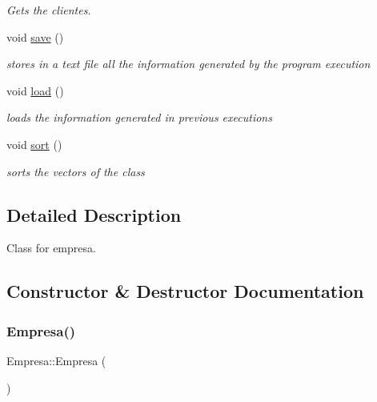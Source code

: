 \begin{DoxyCompactItemize}
\begin{DoxyCompactList}\small\item\em Gets the clientes. \end{DoxyCompactList}\item 
\mbox{\label{classEmpresa_afbde694da902870437443de43dae8071}} 
void \hyperlink{classEmpresa_afbde694da902870437443de43dae8071}{save} ()
\begin{DoxyCompactList}\small\item\em stores in a text file all the information generated by the program execution \end{DoxyCompactList}\item 
\mbox{\label{classEmpresa_a3445c3c507b4f45d1d7831908ff4cdf1}} 
void \hyperlink{classEmpresa_a3445c3c507b4f45d1d7831908ff4cdf1}{load} ()
\begin{DoxyCompactList}\small\item\em loads the information generated in previous executions \end{DoxyCompactList}\item 
\mbox{\label{classEmpresa_aa7424cde3bdf1b1921967bc176d0ab50}} 
void \hyperlink{classEmpresa_aa7424cde3bdf1b1921967bc176d0ab50}{sort} ()
\begin{DoxyCompactList}\small\item\em sorts the vectors of the class \end{DoxyCompactList}\end{DoxyCompactItemize}


\subsection{Detailed Description}
Class for empresa. 

\subsection{Constructor \& Destructor Documentation}
\mbox{\label{classEmpresa_aff124b958356c479ab50ddf4cf302193}} 
\subsubsection{\texorpdfstring{Empresa()}{Empresa()}}
{\footnotesize\ttfamily Empresa\+::\+Empresa (\begin{DoxyParamCaption}{ }\end{DoxyParamCaption})}



